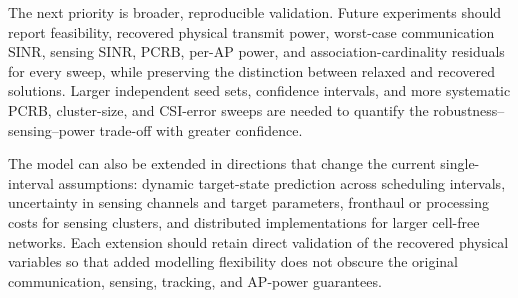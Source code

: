 The next priority is broader, reproducible validation. Future experiments
should report feasibility, recovered physical transmit power, worst-case
communication SINR, sensing SINR, PCRB, per-AP power, and
association-cardinality residuals for every sweep, while preserving the
distinction between relaxed and recovered solutions. Larger independent seed
sets, confidence intervals, and more systematic PCRB, cluster-size, and
CSI-error sweeps are needed to quantify the robustness--sensing--power
trade-off with greater confidence.

The model can also be extended in directions that change the current
single-interval assumptions: dynamic target-state prediction across scheduling
intervals, uncertainty in sensing channels and target parameters, fronthaul or
processing costs for sensing clusters, and distributed implementations for
larger cell-free networks. Each extension should retain direct validation of
the recovered physical variables so that added modelling flexibility does not
obscure the original communication, sensing, tracking, and AP-power guarantees.
